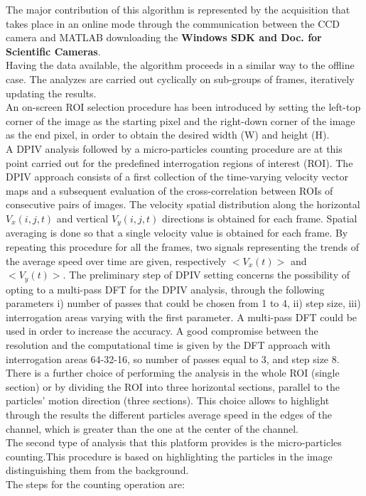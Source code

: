 \documentclass[journal]{IEEEtran}
\theoremstyle{definition}
\theoremstyle{remark}
\begin{document}
The major contribution of this algorithm is represented by the acquisition that takes place in an online mode through the communication between the CCD camera and MATLAB downloading the \textbf{Windows SDK and Doc. for Scientific Cameras}.
\\Having the data available, the algorithm proceeds in a similar way to the offline case. The analyzes are carried out cyclically on sub-groups of frames, iteratively updating the results.
\\An on-screen ROI selection procedure has been introduced by setting the left-top corner of the image as the starting pixel and the right-down corner of the image as the end pixel, in order to obtain the desired width (W) and height (H).
\\A DPIV analysis followed by a micro-particles counting procedure are at this point carried out for the predefined interrogation regions of interest (ROI). The DPIV approach  consists of a first collection of the
time-varying velocity vector maps and a subsequent evaluation of the cross-correlation between ROIs of consecutive pairs of images. The velocity spatial distribution along the horizontal $V_x(i,j,t)$ and vertical $V_y(i,j,t)$ directions is obtained for each frame. Spatial averaging is done so that a single velocity value is obtained for each frame. By repeating this procedure for all the frames, two signals representing the trends of the average speed over time are given, respectively $<V_x(t)>$ and $<V_y(t)>$.
The preliminary step of DPIV setting concerns the possibility of opting to a multi-pass DFT for the DPIV analysis, through the following parameters i) number of passes that could be chosen from 1 to 4, ii) step size, iii) interrogation areas varying with the first parameter. 
A multi-pass DFT could be used in order to increase the accuracy. A good compromise between the resolution and the computational time is given by the DFT approach with interrogation areas 64-32-16, so number of passes equal to 3, and step size 8. 
\\There is a further choice of performing the analysis in the whole ROI (single section) or by dividing the ROI into three horizontal sections, parallel to the particles' motion direction (three sections). This choice allows to highlight through the results the different particles average speed in the edges of the channel, which is greater than the one at the center of the channel.
\\The second type of analysis that this platform provides is the micro-particles counting.This procedure is based on highlighting the particles in the image distinguishing them from the background.
 \\The steps for the counting operation are:
 
\end{document}
